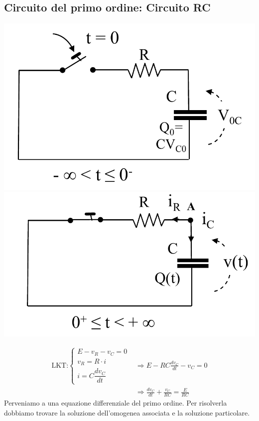 \documentclass{article}
\begin{document}
\subsection{Circuito del primo ordine: Circuito RC}
\begin{center}
    \includegraphics[scale=0.4]{Image/RC_0.png}
    \includegraphics[scale=0.4]{Image/RC_1.png}
\end{center}
\begin{align*}
    \text{LKT:}
    \begin{cases}
        E - v_R - v_C = 0\\
        v_R = R \cdot i \\
        i = C \dfrac{dv_C}{dt}
    \end{cases}
    &\Longrightarrow E - RC \frac{dv_C}{dt} - v_C = 0\\
    &\Longrightarrow \frac{dv_C}{dt} + \frac{v_C}{RC} = \frac{E}{RC}
\end{align*}
Perveniamo a una equazione differenziale del primo ordine. Per risolverla dobbiamo trovare la soluzione dell'omogenea associata e la soluzione particolare.
\end{document}
